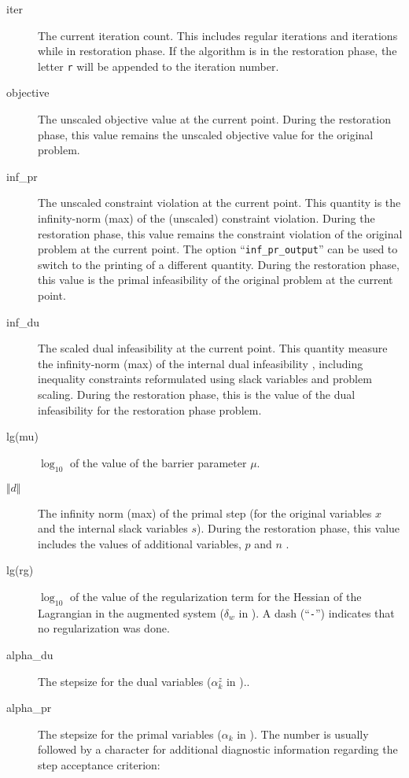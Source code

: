 \begin{description}
\item[iter]
The current iteration count.
This includes regular iterations and iterations while in restoration phase.
If the algorithm is in the restoration phase, the letter \texttt{r} will be appended to the iteration number.
\item[objective]
The unscaled objective value at the current point.
During the restoration phase, this value remains the unscaled objective value for the original problem.
\item[inf\_pr]
The unscaled constraint violation at the current point.
This quantity is the infinity-norm (max) of the (unscaled) constraint violation.
During the restoration phase, this value remains the constraint violation of the original problem at the current point.
The option ``\texttt{inf\_pr\_output}'' can be used to switch to the printing of a different quantity.
During the restoration phase, this value is the primal infeasibility of the original problem at the current point.
\item[inf\_du]
The scaled dual infeasibility at the current point.
This quantity measure the infinity-norm (max) of the internal dual infeasibility \cite[Eq.~(4a)]{WaBi2006}, including inequality constraints reformulated using slack variables and problem scaling.
During the restoration phase, this is the value of the dual infeasibility for the restoration phase problem.
\item[lg(mu)]
$\log_{10}$ of the value of the barrier parameter $\mu$.
\item[$\Vert d\Vert$]
The infinity norm (max) of the primal step (for the original variables $x$ and the internal slack variables $s$).
During the restoration phase, this value includes the values of additional variables, $p$ and $n$ \cite[Eq.~(10)]{WaBi2006}.
\item[lg(rg)]
$\log_{10}$ of the value of the regularization term for the Hessian of the Lagrangian in the augmented system ($\delta_w$ in \cite[Eq.~(26)]{WaBi2006}).
A dash (``\texttt{-}'') indicates that no regularization was done.
\item[alpha\_du]
The stepsize for the dual variables ($\alpha^z_k$ in \cite[Eq.~(14c)]{WaBi2006})..
\item[alpha\_pr]
The stepsize for the primal variables ($\alpha_k$ in \cite[Eq.~(14a)]{WaBi2006}).
The number is usually followed by a character for additional diagnostic information regarding the step acceptance criterion:
 \begin{list}{blub}{\itemsep0pt}

\end{list}
\end{description}
